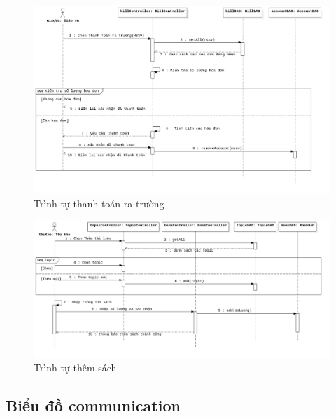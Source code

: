 \documentclass[../report.tex]{subfiles}
\begin{document}
\begin{figure}[H]
\centering
\includegraphics[width=\textwidth]{figures/thanhtoanratruongseq.png}
\caption{Trình tự thanh toán ra trường}
\end{figure}

\begin{figure}[H]
\centering
\includegraphics[width=\textwidth]{figures/themTlseq.png}
\caption{Trình tự thêm sách}
\end{figure}


\subsection{Biểu đồ communication}
\end{document}
